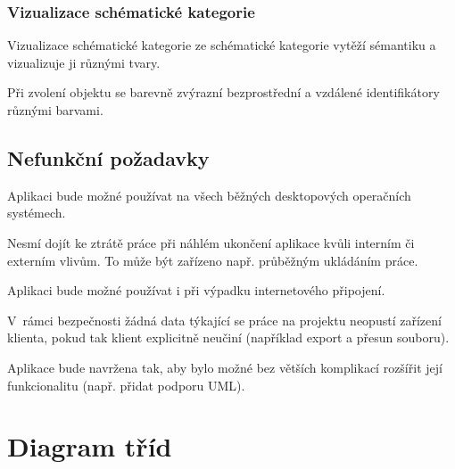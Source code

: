 \subsubsection*{Vizualizace schématické kategorie}
\begin{enumfp}[resume]
  \item Vizualizace schématické kategorie ze schématické kategorie vytěží sémantiku a vizualizuje ji různými tvary.
  \item Při zvolení objektu se barevně zvýrazní bezprostřední a vzdálené identifikátory různými barvami.
\end{enumfp}

\subsection{Nefunkční požadavky}

\begin{enumnfp}
  \item Aplikaci bude možné používat na všech běžných desktopových operačních systémech.
  \item Nesmí dojít ke ztrátě práce při náhlém ukončení aplikace kvůli interním či externím vlivům.
  To může být zařízeno např. průběžným ukládáním práce.
  \item Aplikaci bude možné používat i při výpadku internetového připojení.
  \item V~rámci bezpečnosti žádná data týkající se práce na projektu neopustí zařízení klienta, pokud tak klient explicitně neučiní (například export a přesun souboru).
  \item Aplikace bude navržena tak, aby bylo možné bez větších komplikací rozšířit její funkcionalitu (např. přidat podporu UML).
\end{enumnfp}

\section{Diagram tříd}

